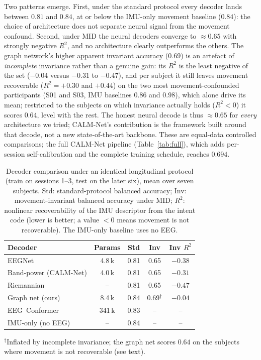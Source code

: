 \documentclass[conference]{IEEEtran}
\begin{document}
Two patterns emerge. First, under the standard protocol every decoder lands between
$0.81$ and $0.84$, at or below the IMU-only movement baseline ($0.84$): the choice of
architecture does not separate neural signal from the movement confound. Second,
under MID the neural decoders converge to $\approx\!0.65$ with strongly negative
$R^2$, and no architecture clearly outperforms the others. The graph network's higher
apparent invariant accuracy ($0.69$) is an artefact of \emph{incomplete} invariance
rather than a genuine gain: its $R^2$ is the least negative of the set ($-0.04$ versus
$-0.31$ to $-0.47$), and per subject it still leaves movement recoverable ($R^2=+0.30$
and $+0.44$) on the two most movement-confounded participants (S01 and S03, IMU
baselines $0.86$ and $0.98$), which alone drive its mean; restricted to the subjects
on which invariance actually holds ($R^2<0$) it scores $0.64$, level with the rest.
The honest neural decode is thus $\approx\!0.65$ for \emph{every} architecture we
tried; CALM-Net's contribution is the framework built around that decode, not a new
state-of-the-art backbone. These are equal-data controlled comparisons; the full
CALM-Net pipeline (Table~\ref{tab:full}), which adds per-session self-calibration and
the complete training schedule, reaches $0.694$.

\begin{table}[t]
\caption{Decoder comparison under an identical longitudinal protocol (train on
sessions 1--3, test on the later six), mean over seven subjects. Std: standard-protocol
balanced accuracy; Inv: movement-invariant balanced accuracy under MID; $R^2$:
nonlinear recoverability of the IMU descriptor from the intent code (lower is better;
a value ${<}0$ means movement is not recoverable). The IMU-only baseline uses no EEG.}
\label{tab:arch}
\centering
\begin{tabular}{lcccc}
\toprule
Decoder & Params & Std & Inv & Inv $R^2$ \\
\midrule
EEGNet~\cite{lawhern2018}       & 4.8\,k & 0.81 & 0.65 & $-0.38$ \\
Band-power (CALM-Net)           & 4.0\,k & 0.81 & 0.65 & $-0.31$ \\
Riemannian~\cite{barachant2012} & --     & 0.81 & 0.65 & $-0.47$ \\
Graph net (ours)                & 8.4\,k & 0.84 & 0.69$^\dagger$ & $-0.04$ \\
EEG~Conformer~\cite{song2023}   & 341\,k & 0.83 & --   & -- \\
\midrule
IMU-only (no EEG)               & --     & 0.84 & --   & -- \\
\bottomrule
\end{tabular}

\vspace{2pt}
{\footnotesize $^\dagger$Inflated by incomplete invariance; the graph net scores
$0.64$ on the subjects where movement is not recoverable (see text).}
\end{table}
\end{document}
